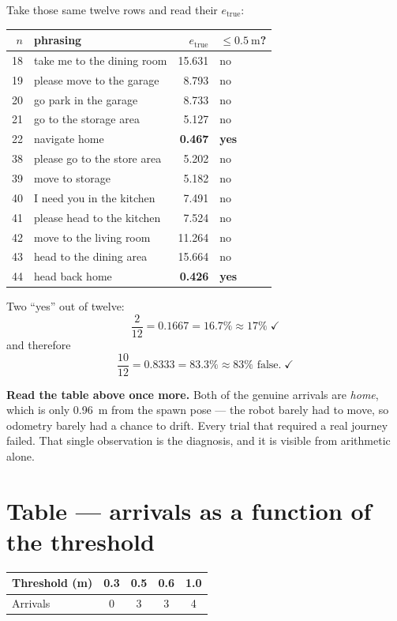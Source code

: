\documentclass[11pt,a4paper]{report}
\begin{document}
\begin{handbox}
Take those same twelve rows and read their $e_{\text{true}}$:
\begin{center}
\small
\begin{tabular}{@{}rlrl@{}}
\toprule
$n$ & phrasing & $e_{\text{true}}$ & $\le \SI{0.5}{\metre}$? \\
\midrule
18 & take me to the dining room & 15.631 & no \\
19 & please move to the garage  &  8.793 & no \\
20 & go park in the garage      &  8.733 & no \\
21 & go to the storage area     &  5.127 & no \\
22 & navigate home              &  \textbf{0.467} & \textbf{yes} \\
38 & please go to the store area&  5.202 & no \\
39 & move to storage            &  5.182 & no \\
40 & I need you in the kitchen  &  7.491 & no \\
41 & please head to the kitchen &  7.524 & no \\
42 & move to the living room    & 11.264 & no \\
43 & head to the dining area    & 15.664 & no \\
44 & head back home             &  \textbf{0.426} & \textbf{yes} \\
\bottomrule
\end{tabular}
\end{center}
Two ``yes'' out of twelve:
\[
\frac{2}{12} = 0.1667 = 16.7\% \approx 17\% \;\checkmark
\]
and therefore
\[
\frac{10}{12} = 0.8333 = 83.3\% \approx 83\% \text{ false.} \;\checkmark
\]

\textbf{Read the table above once more.} Both of the genuine arrivals are
\emph{home}, which is only \SI{0.96}{\metre} from the spawn pose --- the robot
barely had to move, so odometry barely had a chance to drift. Every trial that
required a real journey failed. That single observation is the diagnosis, and
it is visible from arithmetic alone.
\end{handbox}

\section{Table --- arrivals as a function of the threshold}

\begin{center}
\begin{tabular}{@{}lcccc@{}}
\toprule
Threshold (\si{\metre}) & 0.3 & 0.5 & 0.6 & 1.0 \\
\midrule
Arrivals & 0 & 3 & 3 & 4 \\
\bottomrule
\end{tabular}
\end{center}
\end{document}

